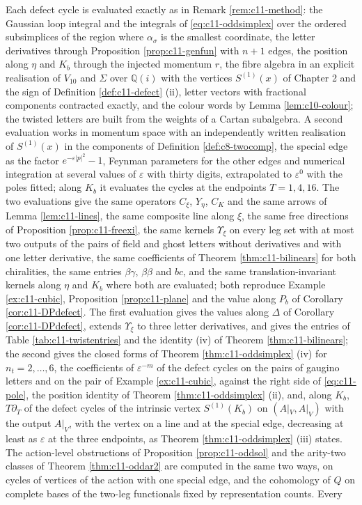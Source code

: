 \begin{remark}
\label{rem:c11-oddmethod}
Each defect cycle is evaluated exactly as in Remark \ref{rem:c11-method}: the Gaussian loop integral and the integrals of \eqref{eq:c11-oddsimplex} over the ordered subsimplices of the region where $\alpha_\sigma$ is the smallest coordinate, the letter derivatives through Proposition \ref{prop:c11-genfun} with $n+1$ edges, the position along $\eta$ and $K_b$ through the injected momentum $r$, the fibre algebra in an explicit realisation of $V_{10}$ and $\Sigma$ over $\mathbb Q(i)$ with the vertices $S^{(1)}(x)$ of Chapter 2 and the sign of Definition \ref{def:c11-defect} (ii), letter vectors with fractional components contracted exactly, and the colour words by Lemma \ref{lem:c10-colour}; the twisted letters are built from the weights of a Cartan subalgebra. A second evaluation works in momentum space with an independently written realisation of $S^{(1)}(x)$ in the components of Definition \ref{def:c8-twocomp}, the special edge as the factor $e^{-\varepsilon|p|^2}-1$, Feynman parameters for the other edges and numerical integration at several values of $\varepsilon$ with thirty digits, extrapolated to $\varepsilon^0$ with the poles fitted; along $K_b$ it evaluates the cycles at the endpoints $T=1,4,16$. The two evaluations give the same operators $C_\xi$, $Y_\eta$, $C_K$ and the same arrows of Lemma \ref{lem:c11-lines}, the same composite line along $\xi$, the same free directions of Proposition \ref{prop:c11-freexi}, the same kernels $\Upsilon_\xi$ on every leg set with at most two outputs of the pairs of field and ghost letters without derivatives and with one letter derivative, the same coefficients of Theorem \ref{thm:c11-bilinears} for both chiralities, the same entries $\beta\gamma$, $\beta\beta$ and $bc$, and the same translation-invariant kernels along $\eta$ and $K_b$ where both are evaluated; both reproduce Example \ref{ex:c11-cubic}, Proposition \ref{prop:c11-plane} and the value along $P_b$ of Corollary \ref{cor:c11-DPdefect}. The first evaluation gives the values along $\Delta$ of Corollary \ref{cor:c11-DPdefect}, extends $\Upsilon_\xi$ to three letter derivatives, and gives the entries of Table \ref{tab:c11-twistentries} and the identity (iv) of Theorem \ref{thm:c11-bilinears}; the second gives the closed forms of Theorem \ref{thm:c11-oddsimplex} (iv) for $n_t=2,\dots,6$, the coefficients of $\varepsilon^{-m}$ of the defect cycles on the pairs of gaugino letters and on the pair of Example \ref{ex:c11-cubic}, against the right side of \eqref{eq:c11-pole}, the position identity of Theorem \ref{thm:c11-oddsimplex} (ii), and, along $K_b$, $T\partial_T$ of the defect cycles of the intrinsic vertex $S^{(1)}(K_b)$ on $(A|_V,A|_V)$ with the output $A|_V$, with the vertex on a line and at the special edge, decreasing at least as $\varepsilon$ at the three endpoints, as Theorem \ref{thm:c11-oddsimplex} (iii) states. The action-level obstructions of Proposition \ref{prop:c11-oddsol} and the arity-two classes of Theorem \ref{thm:c11-oddar2} are computed in the same two ways, on cycles of vertices of the action with one special edge, and the cohomology of $Q$ on complete bases of the two-leg functionals fixed by representation counts. Every 
\end{remark}
